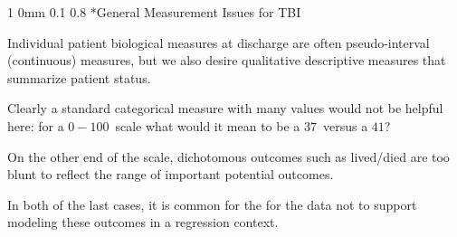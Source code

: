 \documentclass[12pt]{article}
\makeatletter
\newcommand{\9}{\\[9pt]}
\newcommand{\bgm}{\color{MyMath}}
\newcommand{\egm}{\color{white}}
\renewcommand{\section}{\@startsection
	    {section}%
	    {1}%
	    {0mm}%
	    {0.1\baselineskip}%
	    {0.8\baselineskip}%
	    {\newpage \color[cmyk]{0.43,0,0.01,0} \center\LARGE}}%
\makeatother
\begin{document}
\begin{landscape}
\begin{Large}
{\section*{General Measurement Issues for TBI}
\begin{ohlist}
    \item   Individual patient biological measures at discharge are often pseudo-interval (continuous) measures, but we also desire 
            qualitative descriptive measures that summarize patient status.
    \item   Clearly a standard categorical measure with many values would not be helpful here: for a \bgm$0-100$\egm\ scale what would it mean to be
            a \bgm$37$\egm\ versus a \bgm$41$\egm?
    \item   On the other end of the scale, dichotomous outcomes such as lived/died are too blunt to reflect the range of important
            potential outcomes.
    \item   In both of the last cases, it is common for the for the data not to support modeling these outcomes in a regression
            context.
\end{ohlist}

}
\end{Large}
\end{landscape}
\end{document}
